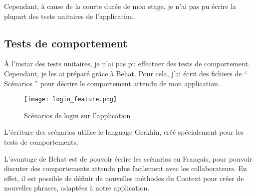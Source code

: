Cependant, à cause de la courte durée de mon stage, je n'ai pas pu écrire la plupart des tests unitaires de l'application.

\subsection{Tests de comportement}

À l'instar des tests unitaires, je n'ai pas pu effectuer des tests de comportement. Cependant, je les ai préparé grâce à Behat. Pour cela, j'ai écrit des fichiers de `` Scénarios '' pour décrire le comportement attendu de mon application.

\begin{figure}[H]
\begin{center}
\texttt{[image: login\_feature.png]}
\end{center}
\caption{Scénarios de login sur l'application}
\end{figure}

L'écriture des scénarios utilise le language Gerkhin, créé spécialement pour les tests de comportements.

L'avantage de Behat est de pouvoir écrire les scénarios en Français, pour pouvoir discuter des comportements attendu plus facilement avec les collaborateurs. En effet, il est possible de définir de nouvelles méthodes du Context pour créer de nouvelles phrases, adaptées à notre application.